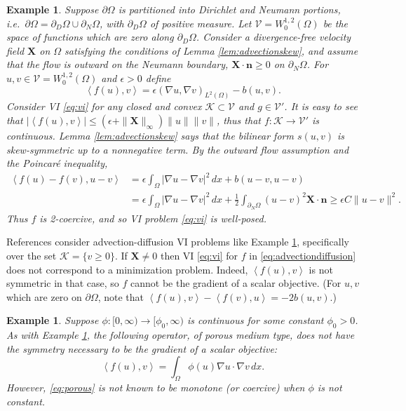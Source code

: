 \documentclass[letterpaper,final,12pt,reqno]{amsart}
\theoremstyle{cstyle}
\theoremstyle{cstyle*}
\theoremstyle{dstyle}
\newtheorem{example}[theorem]{Example}
\numberwithin{equation}{section}
\numberwithin{figure}{section}
\numberwithin{table}{section}
\numberwithin{theorem}{section}
\newcommand{\eps}{\epsilon}
\newcommand{\grad}{\nabla}
\newcommand{\bn}{\mathbf{n}}
\newcommand{\bX}{\mathbf{X}}
\newcommand{\cK}{\mathcal{K}}
\newcommand{\cV}{\mathcal{V}}
\newcommand{\ip}[2]{\left<#1,#2\right>}
\begin{document}
\begin{example}  \label{ex:advectiondiffusion}  Suppose $\partial\Omega$ is partitioned into Dirichlet and Neumann portions, i.e.~$\partial\Omega = \partial_D\Omega \cup \partial_N\Omega$, with $\partial_D\Omega$ of positive measure.  Let $\cV = W_0^{1,2}(\Omega)$ be the space of functions which are zero along $\partial_D\Omega$.  Consider a divergence-free velocity field $\bX$ on $\Omega$ satisfying the conditions of Lemma \ref{lem:advectionskew}, and assume that the flow is outward on the Neumann boundary, $\bX \cdot \bn \ge 0$ on $\partial_N\Omega$.  For $u,v \in \cV = W_0^{1,2}(\Omega)$ and $\eps>0$ define
\begin{equation}
\ip{f(u)}{v} = \eps \left(\grad u, \grad v\right)_{L^2(\Omega)} - b(u,v). \label{eq:advectiondiffusion}
\end{equation}
Consider VI \eqref{eq:vi} for any closed and convex $\cK \subset \cV$ and $g\in\cV'$.  It is easy to see that $|\ip{f(u)}{v}| \le (\eps + \|\bX\|_\infty) \|u\| \|v\|$, thus that $f:\cK \to \cV'$ is continuous.  Lemma \ref{lem:advectionskew} says that the bilinear form $s(u,v)$ is skew-symmetric up to a nonnegative term.  By the outward flow assumption and the Poincar\'e inequality,
\begin{align*}
\ip{f(u)-f(v)}{u-v} &= \eps \int_\Omega |\grad u - \grad v|^2\,dx + b(u-v,u-v) \\
                    &= \eps \int_\Omega |\grad u - \grad v|^2\,dx + \frac{1}{2} \int_{\partial_N\Omega} (u-v)^2 \bX\cdot\bn \ge \eps C \|u-v\|^2.
\end{align*}
Thus $f$ is 2-coercive, and so VI problem \eqref{eq:vi} is well-posed.
\end{example}

References \cite{Bueler2021conservation,ChangNakshatrala2017} consider advection-diffusion VI problems like Example \ref{ex:advectiondiffusion}, specifically over the set $\cK = \{v\ge 0\}$.  If $\bX \ne 0$ then VI \eqref{eq:vi} for $f$ in \eqref{eq:advectiondiffusion} does not correspond to a minimization problem.  Indeed, $\ip{f(u)}{v}$ is not symmetric in that case, so $f$ cannot be the gradient of a scalar objective.  (For $u,v$ which are zero on $\partial \Omega$, note that $\ip{f(u)}{v} - \ip{f(v)}{u} = -2 b(u,v)$.)

\begin{example}  \label{ex:porous}  Suppose $\phi:[0,\infty) \to [\phi_0,\infty)$ is continuous for some constant $\phi_0>0$.  As with Example \ref{ex:advectiondiffusion}, the following operator, of porous medium type, does not have the symmetry necessary to be the gradient of a scalar objective:
\begin{equation}
\ip{f(u)}{v} = \int_\Omega \phi(u) \grad u \cdot \grad v\,dx. \label{eq:porous}
\end{equation}
However, \eqref{eq:porous} is not known to be monotone (or coercive) when $\phi$ is not constant.
\end{example}
\end{document}
